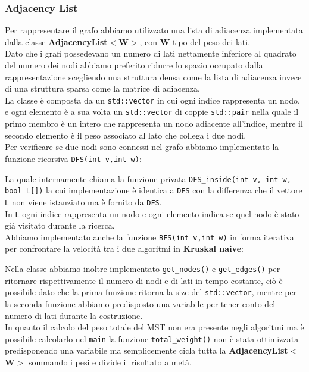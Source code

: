 \documentclass[]{article}
\begin{document}
\subsubsection{Adjacency List}
\begin{flushleft}
Per rappresentare il grafo abbiamo utilizzato una lista di adiacenza implementata dalla classe \textbf{AdjacencyList$<$W$>$}, con \textbf{W} tipo del peso dei lati.\\
Dato che i grafi possedevano un numero di lati nettamente inferiore al quadrato del numero dei nodi abbiamo preferito ridurre lo spazio occupato dalla rappresentazione scegliendo una struttura densa come la lista di adiacenza invece di una struttura sparsa come la matrice di adiacenza.\\
La classe è composta da un \verb|std::vector| in cui ogni indice rappresenta un nodo, e ogni elemento è a sua volta un \verb|std::vector| di coppie \verb|std::pair| nella quale il primo membro è un intero che rappresenta un nodo adiacente all'indice, mentre il secondo elemento è il peso associato al lato che collega i due nodi.\\

Per verificare se due nodi sono connessi nel grafo abbiamo implementato la funzione ricorsiva \verb|DFS(int v,int w)|:
\lstset{language=c++, style=mystyle}

La quale internamente chiama la funzione privata \verb|DFS_inside(int v, int w, bool L[])| la cui implementazione è identica a \verb|DFS| con la differenza che il vettore \verb|L| non viene istanziato ma è fornito da \verb|DFS|.\\
In \verb|L| ogni indice rappresenta un nodo e ogni elemento indica se quel nodo è stato già visitato durante la ricerca.\\
Abbiamo implementato anche la funzione \verb|BFS(int v,int w)| in forma iterativa per confrontare la velocità tra i due algoritmi in \textbf{Kruskal naive}:
\lstset{language=c++, style=mystyle}

\end{flushleft}
Nella classe abbiamo inoltre implementato  \verb|get_nodes()| e \verb|get_edges()| per ritornare rispettivamente il numero di nodi e di lati in tempo costante, ciò è possibile dato che la prima funzione ritorna la size del \verb|std::vector|, mentre per la seconda funzione abbiamo predisposto una variabile per tener conto del numero di lati durante la costruzione.\\
In quanto il calcolo del peso totale del MST non era presente negli algoritmi ma è possibile calcolarlo nel \verb|main| la funzione \verb|total_weight()| non è stata ottimizzata predisponendo una variabile ma semplicemente cicla tutta la \textbf{AdjacencyList$<$W$>$} sommando i pesi e divide il risultato a metà.
\lstset{language=c++, style=mystyle}

\newpage
\end{document}
